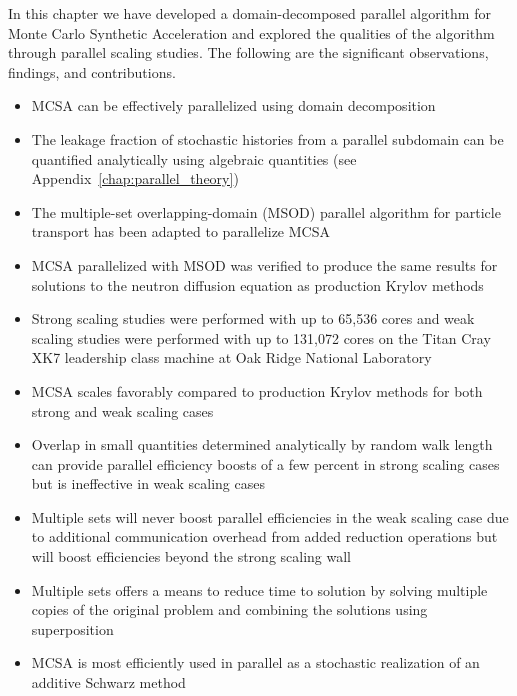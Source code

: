 In this chapter we have developed a domain-decomposed parallel
algorithm for Monte Carlo Synthetic Acceleration and explored the
qualities of the algorithm through parallel scaling studies. The
following are the significant observations, findings, and
contributions.

\begin{itemize}
\item MCSA can be effectively parallelized using domain decomposition
\item The leakage fraction of stochastic histories from a parallel
  subdomain can be quantified analytically using algebraic quantities
  (see Appendix~\ref{chap:parallel_theory})
\item The multiple-set overlapping-domain (MSOD) parallel algorithm
  for particle transport has been adapted to parallelize MCSA
\item MCSA parallelized with MSOD was verified to produce the same
  results for solutions to the neutron diffusion equation as
  production Krylov methods
\item Strong scaling studies were performed with up to 65,536 cores
  and weak scaling studies were performed with up to 131,072 cores on
  the Titan Cray XK7 leadership class machine at Oak Ridge National
  Laboratory
\item MCSA scales favorably compared to production Krylov methods for
  both strong and weak scaling cases
\item Overlap in small quantities determined analytically by random
  walk length can provide parallel efficiency boosts of a few percent
  in strong scaling cases but is ineffective in weak scaling cases
\item Multiple sets will never boost parallel efficiencies in the weak
  scaling case due to additional communication overhead from added
  reduction operations but will boost efficiencies beyond the strong
  scaling wall
\item Multiple sets offers a means to reduce time to solution by
  solving multiple copies of the original problem and combining the
  solutions using superposition
\item MCSA is most efficiently used in parallel as a stochastic
  realization of an additive Schwarz method
\end{itemize}
